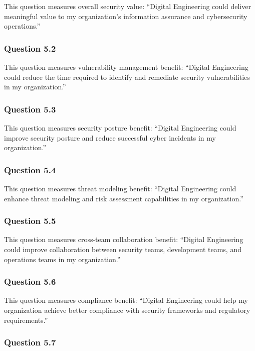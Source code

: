 This question measures overall security value: ``Digital Engineering could deliver meaningful value to my organization's information assurance and cybersecurity operations.''

\subsubsection{Question 5.2}

This question measures vulnerability management benefit: ``Digital Engineering could reduce the time required to identify and remediate security vulnerabilities in my organization.''

\subsubsection{Question 5.3}

This question measures security posture benefit: ``Digital Engineering could improve security posture and reduce successful cyber incidents in my organization.''

\subsubsection{Question 5.4}

This question measures threat modeling benefit: ``Digital Engineering could enhance threat modeling and risk assessment capabilities in my organization.''

\subsubsection{Question 5.5}

This question measures cross-team collaboration benefit: ``Digital Engineering could improve collaboration between security teams, development teams, and operations teams in my organization.''

\subsubsection{Question 5.6}

This question measures compliance benefit: ``Digital Engineering could help my organization achieve better compliance with security frameworks and regulatory requirements.''

\subsubsection{Question 5.7}

